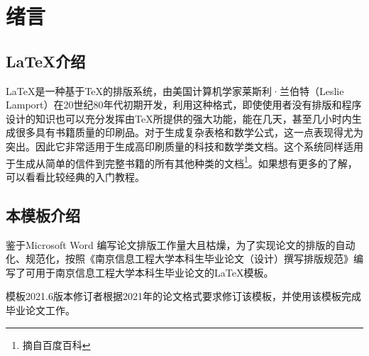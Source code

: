 \section{绪言}
\subsection{\LaTeX 介绍}
\LaTeX 是一种基于\TeX 的排版系统，由美国计算机学家莱斯利·兰伯特（Leslie Lamport）在20世纪80年代初期开发，利用这种格式，即使使用者没有排版和程序设计的知识也可以充分发挥由\TeX 所提供的强大功能，能在几天，甚至几小时内生成很多具有书籍质量的印刷品。对于生成复杂表格和数学公式，这一点表现得尤为突出。因此它非常适用于生成高印刷质量的科技和数学类文档。这个系统同样适用于生成从简单的信件到完整书籍的所有其他种类的文档\footnote{摘自百度百科}。如果想有更多的了解，可以看看比较经典的入门教程\cite{x1}。

\subsection{本模板介绍}
鉴于Microsoft Word 编写论文排版工作量大且枯燥，为了实现论文的排版的自动化、规范化，按照《南京信息工程大学本科生毕业论文（设计）撰写排版规范》编写了可用于南京信息工程大学本科生毕业论文的\LaTeX 模板。

模板2021.6版本修订者根据2021年的论文格式要求修订该模板，并使用该模板完成毕业论文工作。